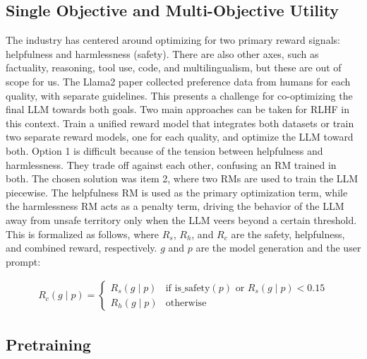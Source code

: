 \documentclass[
  letterpaper,
  numbers=noenddot,
  DIV=11]{scrreprt}
\theoremstyle{plain}
\theoremstyle{definition}
\theoremstyle{plain}
\theoremstyle{remark}
\begin{document}
\subsection{Single Objective and Multi-Objective
Utility}\label{single-objective-and-multi-objective-utility}

The industry has centered around optimizing for two primary reward
signals: helpfulness and harmlessness (safety). There are also other
axes, such as factuality, reasoning, tool use, code, and
multilingualism, but these are out of scope for us. The Llama2 paper
collected preference data from humans for each quality, with separate
guidelines. This presents a challenge for co-optimizing the final LLM
towards both goals. Two main approaches can be taken for RLHF in this
context. Train a unified reward model that integrates both datasets or
train two separate reward models, one for each quality, and optimize the
LLM toward both. Option 1 is difficult because of the tension between
helpfulness and harmlessness. They trade off against each other,
confusing an RM trained in both. The chosen solution was item 2, where
two RMs are used to train the LLM piecewise. The helpfulness RM is used
as the primary optimization term, while the harmlessness RM acts as a
penalty term, driving the behavior of the LLM away from unsafe territory
only when the LLM veers beyond a certain threshold. This is formalized
as follows, where \(R_s\), \(R_h\), and \(R_c\) are the safety,
helpfulness, and combined reward, respectively. \(g\) and \(p\) are the
model generation and the user prompt:

\[
\begin{aligned}
    R_c(g \mid p) =
    \begin{cases}
        R_s(g \mid p) & \text{if } \text{is\_safety}(p) \text{ or } R_s(g \mid p) < 0.15 \\
        R_h(g \mid p) & \text{otherwise}
    \end{cases}
\end{aligned}
\]

\subsection{Pretraining}\label{pretraining}
\end{document}
